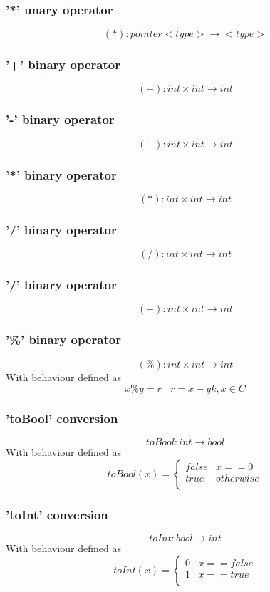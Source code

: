 \documentclass{article}
\begin{document}
\subsubsection{'*' unary operator}
$$
(*): pointer <type> \longrightarrow <type> 
$$

\subsubsection{'+' binary operator}
$$
(+): int \times int \longrightarrow int
$$

\subsubsection{'-' binary operator}
$$
(-): int \times int \longrightarrow int
$$

\subsubsection{'*' binary operator}
$$
(*): int \times int \longrightarrow int
$$

\subsubsection{'/' binary operator}
$$
(/): int \times int \longrightarrow int
$$

\subsubsection{'/' binary operator}
$$
(-): int \times int \longrightarrow int
$$
\subsubsection{'\%' binary operator}
$$
(\%): int \times int \longrightarrow int
$$
With behaviour defined as
$$
x\%y = r \ \ \ \ r = x - yk, x \in C
$$

\subsubsection{'toBool' conversion}
$$
toBool: int \longrightarrow bool
$$
With behaviour defined as
$$
toBool(x) =  \left\{ \begin{array}{ll}
false & x == 0  \\
true & otherwise \\
\end{array} \right.
$$

\subsubsection{'toInt' conversion}
$$
toInt: bool \longrightarrow int
$$
With behaviour defined as
$$
toInt(x) =  \left\{ \begin{array}{ll}
0 & x == false  \\
1 & x == true \\
\end{array} \right.
$$
\end{document}
